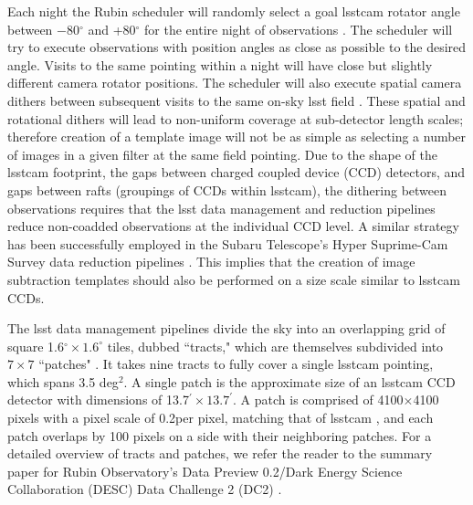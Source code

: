 \documentclass[preprintm,linenumbers]{aastex631}
\begin{document}
	Each night the Rubin scheduler will randomly select a goal \gls*{lsstcam} rotator angle between $-$80$^{\circ}$ and +80$^{\circ}$ for the entire night of observations \citep{v4.0sims}. 
 The scheduler will try to execute observations with position angles as close as possible to the desired angle. Visits to the same pointing within a night will have close but slightly different camera rotator positions. 
 The scheduler will also execute spatial camera dithers between subsequent visits to the same on-sky \gls*{lsst} field \citep{v4.0sims}. 
These spatial and rotational dithers will lead to non-uniform coverage at sub-detector length scales; therefore creation of a template image will not be as simple as selecting a number of images in a given filter at the same field pointing. 
 Due to the shape of the \gls*{lsstcam} footprint, the gaps between charged coupled device (CCD) detectors, and gaps between rafts (groupings of CCDs within \gls*{lsstcam}), the dithering between observations requires that the \gls*{lsst} data management and reduction pipelines reduce non-coadded observations at the individual CCD level. 
 A similar strategy has been successfully employed in the Subaru Telescope's Hyper Suprime-Cam Survey data reduction pipelines \citep{2018PASJ...70S...5B}. 
 This implies that the creation of image subtraction templates should also be performed on a size scale similar to \gls*{lsstcam} CCDs. 
	
	The \gls*{lsst} data management pipelines divide the sky into an overlapping grid of square 1.6$^{\circ} \times 1.6^{\circ}$ tiles, dubbed ``tracts," which are themselves subdivided into $7 \times 7$ ``patches" \citep[see Figure \ref{fig:tractsandpatches} and][]{2018PASJ...70S...5B, LDM-151}. 
	It takes nine tracts to fully cover a single \gls*{lsstcam} pointing, which spans 3.5 deg$^2$. A single patch is the approximate size of an \gls*{lsstcam} CCD detector with dimensions of 13.7$^{\prime} \times 13.7^{\prime}$. A patch is comprised of 4100$\times$4100 pixels with a pixel scale of 0.2\arcsec per pixel, matching that of \gls*{lsstcam} \citep{2019ApJ...873..111I,LDM-151}, and each patch overlaps by 100 pixels on a side with their neighboring patches.  For a detailed overview of tracts and patches, we refer the reader to the summary paper for Rubin Observatory's Data Preview 0.2/Dark Energy Science Collaboration (DESC) Data Challenge 2 (DC2) \citep{2021ApJS..253...31L}.  
	
\end{document}
